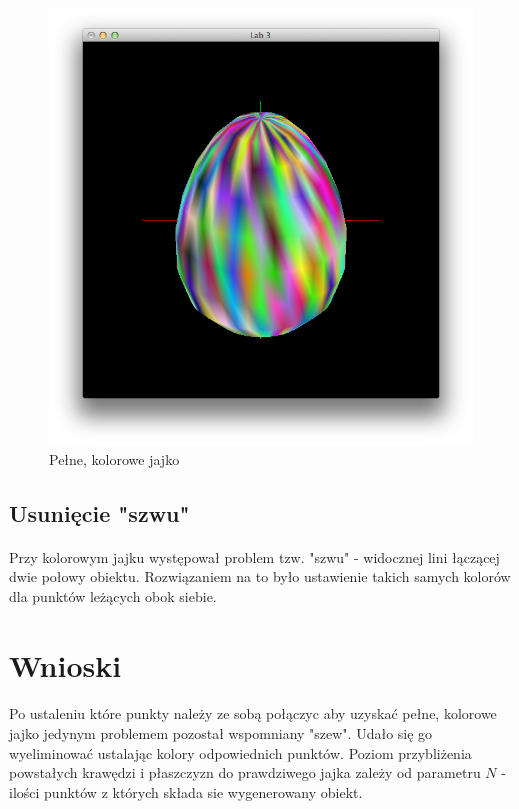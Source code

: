 \documentclass[wide,a4paper,titlepage,12pt] {article}
\begin{document}
  \begin{figure}[htbp]
    \begin{center}
      \includegraphics[scale=0.6]{fill.png}
      \caption{Pełne, kolorowe jajko}
    \end{center}
  \end{figure}

  \newpage


  \subsection{Usunięcie "szwu"}
  \paragraph{}
  Przy kolorowym jajku występował problem tzw. "szwu" - widocznej lini łączącej dwie połowy obiektu.
  Rozwiązaniem na to było ustawienie takich samych kolorów dla punktów leżących obok siebie.

  


  \section{Wnioski}
  \paragraph{}
  Po ustaleniu które punkty należy ze sobą połączyc aby uzyskać pełne, kolorowe jajko jedynym problemem
  pozostał wspomniany "szew". Udało się go wyeliminować ustalając kolory odpowiednich punktów.
  Poziom przybliżenia powstałych krawędzi i płaszczyzn do prawdziwego jajka zależy od parametru $N$ - ilości punktów z których składa sie wygenerowany obiekt.
\end{document}
